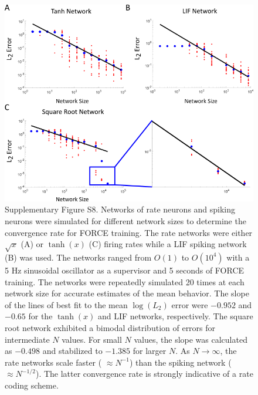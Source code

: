 \documentclass[11pt]{article} %
\begin{document}
\newpage

\begin{figure}[htp!]
\centering
\includegraphics[scale=0.9]{FFIGS10}

    \caption*{Supplementary Figure S8.  Networks of rate neurons and spiking neurons were simulated for different network sizes to determine the  convergence rate for FORCE training.  The rate networks were either $ \sqrt{x}$ (A) or $\tanh(x)$ (C) firing rates while a LIF spiking network (B) was used.  The networks ranged from $O(1)$ to $O(10^4)$ with a 5 Hz sinusoidal oscillator as a supervisor and 5 seconds of FORCE training.   The networks were repeatedly simulated 20 times at each network size for accurate estimates of the mean behavior.  The slope of the lines of best fit to the mean $\log(L_2)$ error were $-0.952$ and $-0.65$ for the $\tanh(x)$ and LIF networks, respectively.   The square root network exhibited a bimodal distribution of errors for intermediate $N$ values.  For small $N$ values, the slope was calculated as $-0.498$ and stabilized to $-1.385$ for larger $N$.   As $N \rightarrow \infty$, the rate networks scale faster ( $\approx N^{-1}$) than the spiking network ( $\approx N^{-1/2}$).  The latter convergence rate is strongly indicative of a rate coding scheme.   }
\end{figure}
\end{document}
